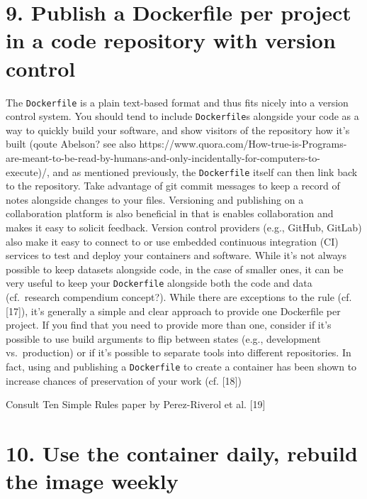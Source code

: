 \documentclass[10pt,letterpaper]{article}
\begin{document}
\hypertarget{publish-a-dockerfile-per-project-in-a-code-repository-with-version-control}{%
\section*{9. Publish a Dockerfile per project in a code repository with
version
control}\label{publish-a-dockerfile-per-project-in-a-code-repository-with-version-control}}

The \texttt{Dockerfile} is a plain text-based format and thus fits
nicely into a version control system. You should tend to include
\texttt{Dockerfile}s alongside your code as a way to quickly build your
software, and show visitors of the repository how it's built (qoute
Abelson? see also
https://www.quora.com/How-true-is-Programs-are-meant-to-be-read-by-humans-and-only-incidentally-for-computers-to-execute)/,
and as mentioned previously, the \texttt{Dockerfile} itself can then
link back to the repository. Take advantage of git commit messages to
keep a record of notes alongside changes to your files. Versioning and
publishing on a collaboration platform is also beneficial in that is
enables collaboration and makes it easy to solicit feedback. Version
control providers (e.g., GitHub, GitLab) also make it easy to connect to
or use embedded continuous integration (CI) services to test and deploy
your containers and software. While it's not always possible to keep
datasets alongside code, in the case of smaller ones, it can be very
useful to keep your \texttt{Dockerfile} alongside both the code and data
(cf.~research compendium concept?). While there are exceptions to the
rule (cf. {[}17{]}), it's generally a simple and clear approach to
provide one Dockerfile per project. If you find that you need to provide
more than one, consider if it's possible to use build arguments to flip
between states (e.g., development vs.~production) or if it's possible to
separate tools into different repositories. In fact, using and
publishing a \texttt{Dockerfile} to create a container has been shown to
increase chances of preservation of your work (cf. {[}18{]})

Consult Ten Simple Rules paper by Perez-Riverol et al. {[}19{]}

\hypertarget{use-the-container-daily-rebuild-the-image-weekly}{%
\section*{10. Use the container daily, rebuild the image
weekly}\label{use-the-container-daily-rebuild-the-image-weekly}}
\end{document}
